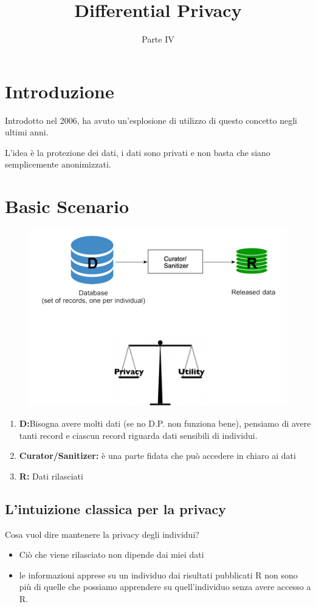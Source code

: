 \documentclass{report}
\title{\huge\textbf{{Differential Privacy}}}
\date{Parte IV}
\begin{document}
\maketitle
\tableofcontents
\newpage

\chapter{Introduzione}
Introdotto nel 2006, ha avuto un'esplosione di utilizzo di questo concetto negli ultimi anni.

\noindent L'idea è la protezione dei dati, i dati sono privati e non basta che siano semplicemente anonimizzati.


\chapter{Basic Scenario}
\begin{figure}[H]
        \centering
        \includegraphics[width=0.6\linewidth]{images/basicScenario.png}
    \end{figure}

\begin{enumerate}
    \item \textbf{D:}Bisogna avere molti dati (se no D.P. non funziona bene), pensiamo di avere tanti record e ciascun record riguarda dati sensibili di individui.
    \item \textbf{Curator/Sanitizer:} è una parte fidata che può accedere in chiaro ai dati
    \item \textbf{R:} Dati rilasciati 
\end{enumerate}

\section{L'intuizione classica per la privacy}
Cosa vuol dire mantenere la privacy degli individui?
\begin{itemize}
    \item Ciò che viene rilasciato non dipende dai miei dati
    \item le informazioni apprese su un individuo dai risultati pubblicati R non sono più di quelle che possiamo apprendere su quell'individuo senza avere accesso a R.
\end{itemize}
\end{document}
